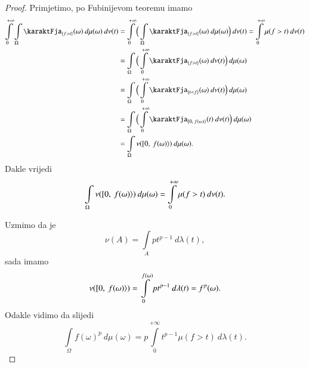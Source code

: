 \begin{proof}
    Primjetimo, po Fubinijevom teoremu imamo
    \begin{equation*}
        \begin{aligned}
            \int\limits_{0}^{+\infty} \int\limits_\Omega \karaktFja_{\{  f > t \}} (\omega)\: d \mu (\omega) \: d \nu (t) &= \int\limits_{0}^{+\infty} \Big( \int\limits_\Omega \karaktFja_{\{  f > t \}} (\omega) \: d \mu (\omega) \Big) \: d \nu (t) = \int\limits_{0}^{+\infty} \mu (f > t) \: d \nu (t)\\
            &= \int\limits_\Omega \Big( \int\limits_{0}^{+\infty} \karaktFja_{\{ f > t \}} (\omega) \: d \nu (t) \Big) \: d \mu (\omega)\\
            &= \int\limits_\Omega \Big( \int\limits_{0}^{+\infty} \karaktFja_{\{ t < f \}} (\omega) \: d \nu (t) \Big) \: d \mu (\omega)\\
            &= \int\limits_\Omega \Big( \int\limits_{0}^{+\infty} \karaktFja_{\desInt{0}{f(\omega)}} (t)  \: d \nu (t) \Big) \: d \mu (\omega)\\
            &= \int\limits_\Omega \nu (\desInt{0}{f (\omega)}) \: d \mu (\omega).
        \end{aligned}
    \end{equation*}
    Dakle vrijedi
    \begin{equation*}
        \int\limits_\Omega \nu ([ {0}, \: {f(\omega)} \rangle) \: d \mu (\omega) = \int\limits_{0}^{+\infty} \mu (f>t) \: d \nu (t).
    \end{equation*}

    Uzmimo da je
    \begin{equation*}
            \nu (A) = \int\limits_A p t^{p-1} \: d \lambda (t) ,
    \end{equation*}
    sada imamo
    \begin{equation*}
        \nu ([ {0}, \: {f(\omega)} \rangle) = \int\limits_{0}^{f(\omega)} p t^{p-1} \: d \lambda (t) = f^p (\omega).
    \end{equation*}
    Odakle vidimo da slijedi
    \begin{equation*}
        \int\limits_\Omega f(\omega)^p \: d \mu (\omega) = p \int\limits_{0}^{+\infty} t^{p-1} \mu (f > t) \: d \lambda (t).
    \end{equation*}
\end{proof}

